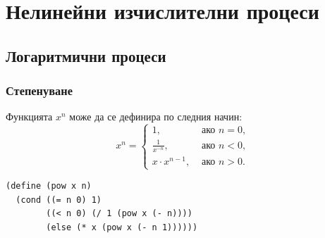 \documentclass[alsotrans]{beamerswitch}
\begin{document}
\section{Нелинейни изчислителни процеси}

\subsection{Логаритмични процеси}

\begin{frame}[fragile]
  \frametitle{Степенуване}

  Функцията $x^n$ може да се дефинира по следния начин:
  \begin{equation*}
    x^n = \begin{cases}
      1,&\text{ ако }n = 0,\\
      \frac 1 {x^{-n}},&\text{ ако }n < 0,\\
      x\cdot x^{n-1},&\text{ ако }n > 0.
    \end{cases}
  \end{equation*}
  \pause
\begin{lstlisting}
(define (pow x n)
  (cond ((= n 0) 1)
        ((< n 0) (/ 1 (pow x (- n))))
        (else (* x (pow x (- n 1))))))
\end{lstlisting}
\end{frame}
\end{document}

